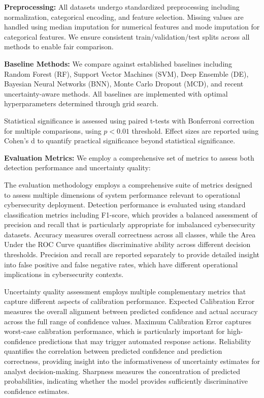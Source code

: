 \documentclass[journal]{IEEEtran}
\begin{document}
\textbf{Preprocessing:} All datasets undergo standardized preprocessing including normalization, categorical encoding, and feature selection. Missing values are handled using median imputation for numerical features and mode imputation for categorical features. We ensure consistent train/validation/test splits across all methods to enable fair comparison.

\textbf{Baseline Methods:} We compare against established baselines including Random Forest (RF), Support Vector Machines (SVM), Deep Ensemble (DE), Bayesian Neural Networks (BNN), Monte Carlo Dropout (MCD), and recent uncertainty-aware methods. All baselines are implemented with optimal hyperparameters determined through grid search.

Statistical significance is assessed using paired t-tests with Bonferroni correction for multiple comparisons, using $p < 0.01$ threshold. Effect sizes are reported using Cohen's d to quantify practical significance beyond statistical significance.

\textbf{Evaluation Metrics:} We employ a comprehensive set of metrics to assess both detection performance and uncertainty quality:

The evaluation methodology employs a comprehensive suite of metrics designed to assess multiple dimensions of system performance relevant to operational cybersecurity deployment. Detection performance is evaluated using standard classification metrics including F1-score, which provides a balanced assessment of precision and recall that is particularly appropriate for imbalanced cybersecurity datasets. Accuracy measures overall correctness across all classes, while the Area Under the ROC Curve quantifies discriminative ability across different decision thresholds. Precision and recall are reported separately to provide detailed insight into false positive and false negative rates, which have different operational implications in cybersecurity contexts.

Uncertainty quality assessment employs multiple complementary metrics that capture different aspects of calibration performance. Expected Calibration Error measures the overall alignment between predicted confidence and actual accuracy across the full range of confidence values. Maximum Calibration Error captures worst-case calibration performance, which is particularly important for high-confidence predictions that may trigger automated response actions. Reliability quantifies the correlation between predicted confidence and prediction correctness, providing insight into the informativeness of uncertainty estimates for analyst decision-making. Sharpness measures the concentration of predicted probabilities, indicating whether the model provides sufficiently discriminative confidence estimates.
\end{document}
